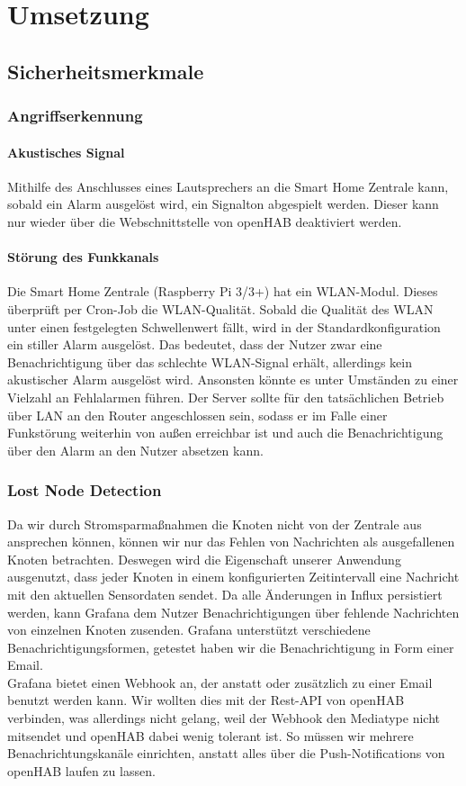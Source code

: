 \documentclass[a4paper,10pt,twocolumn]{article}
\begin{document}
\section{Umsetzung}

\subsection{Sicherheitsmerkmale}
\subsubsection{Angriffserkennung}
\paragraph{Akustisches Signal} Mithilfe des Anschlusses eines Lautsprechers an die Smart Home Zentrale kann, sobald ein Alarm ausgelöst wird, ein Signalton abgespielt werden. Dieser kann nur wieder über die Webschnittstelle von openHAB deaktiviert werden.

\paragraph{Störung des Funkkanals} Die Smart Home Zentrale (Raspberry Pi 3/3+) hat ein WLAN-Modul. Dieses überprüft per Cron-Job die WLAN-Qualität. Sobald die Qualität des WLAN unter einen festgelegten Schwellenwert fällt, wird in der Standardkonfiguration ein stiller Alarm ausgelöst. Das bedeutet, dass der Nutzer zwar eine Benachrichtigung über das schlechte WLAN-Signal erhält, allerdings kein akustischer Alarm ausgelöst wird. Ansonsten könnte es unter Umständen zu einer Vielzahl an Fehlalarmen führen. Der Server sollte für den tatsächlichen Betrieb über LAN an den Router angeschlossen sein, sodass er im Falle einer Funkstörung weiterhin von außen erreichbar ist und auch die Benachrichtigung über den Alarm an den Nutzer absetzen kann.

\subsubsection{Lost Node Detection}
Da wir durch Stromsparmaßnahmen die Knoten nicht von der Zentrale aus ansprechen können, können wir nur das Fehlen von Nachrichten als ausgefallenen Knoten betrachten. Deswegen wird die Eigenschaft unserer Anwendung ausgenutzt, dass jeder Knoten in einem konfigurierten Zeitintervall eine Nachricht mit den aktuellen Sensordaten sendet. Da alle Änderungen in Influx persistiert werden, kann Grafana dem Nutzer Benachrichtigungen über fehlende Nachrichten von einzelnen Knoten zusenden. Grafana unterstützt verschiedene Benachrichtigungsformen, getestet haben wir die Benachrichtigung in Form einer Email.\\
Grafana bietet einen Webhook an, der anstatt oder zusätzlich zu einer Email benutzt werden kann. Wir wollten dies mit der Rest-API von openHAB verbinden, was allerdings nicht gelang, weil der Webhook den Mediatype nicht mitsendet und openHAB dabei wenig tolerant ist. So müssen wir mehrere Benachrichtungskanäle einrichten, anstatt alles über die Push-Notifications von openHAB laufen zu lassen.
\end{document}
